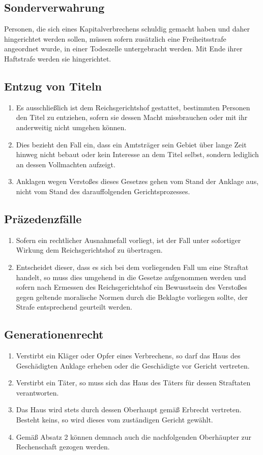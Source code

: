 \documentclass{article}
\begin{document}
\subsection{Sonderverwahrung}
Personen, die sich eines Kapitalverbrechens schuldig gemacht haben und daher hingerichtet werden sollen, müssen sofern zusätzlich eine Freiheitsstrafe angeordnet wurde, in einer Todeszelle untergebracht werden. Mit Ende ihrer Haftstrafe werden sie hingerichtet.

\subsection{Entzug von Titeln}
\begin{enumerate}[(1)]
    \item Es ausschließlich ist dem Reichsgerichtshof gestattet, bestimmten Personen den Titel zu entziehen, sofern sie dessen Macht missbrauchen oder mit ihr anderweitig nicht umgehen können.
    \item Dies bezieht den Fall ein, dass ein Amtsträger sein Gebiet über lange Zeit hinweg nicht bebaut oder kein Interesse an dem Titel selbst, sondern lediglich an dessen Vollmachten aufzeigt.
    \item Anklagen wegen Verstoßes dieses Gesetzes gehen vom Stand der Anklage aus, nicht vom Stand des darauffolgenden Gerichtsprozesses.
\end{enumerate}

\subsection{Präzedenzfälle}
\begin{enumerate}[(1)]
    \item Sofern ein rechtlicher Ausnahmefall vorliegt, ist der Fall unter sofortiger Wirkung dem Reichsgerichtshof zu übertragen.
    \item Entscheidet dieser, dass es sich bei dem vorliegenden Fall um eine Straftat handelt, so muss dies umgehend in die Gesetze aufgenommen werden und
    sofern nach Ermessen des Reichsgerichtshof ein Bewusstsein des Verstoßes gegen geltende moralische Normen durch die Beklagte vorliegen sollte, der Strafe entsprechend
    geurteilt werden.
\end{enumerate}

\subsection{Generationenrecht}
\begin{enumerate}[(1)]
    \item Verstirbt ein Kläger oder Opfer eines Verbrechens, so darf das Haus des Geschädigten Anklage erheben oder die Geschädigte vor Gericht vertreten.
    \item Verstirbt ein Täter, so muss sich das Haus des Täters für dessen Straftaten verantworten.
    \item Das Haus wird stets durch dessen Oberhaupt gemäß Erbrecht vertreten. Besteht keins, so wird dieses vom zuständigen Gericht gewählt.
    \item Gemäß Absatz 2 können demnach auch die nachfolgenden Oberhäupter zur Rechenschaft gezogen werden.    
\end{enumerate}
\end{document}
